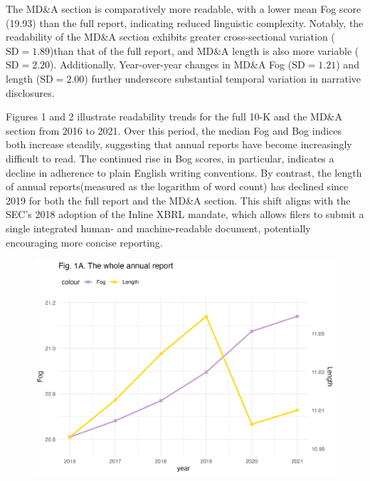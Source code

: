\documentclass[a4paper]{article}
\begin{document}
The MD\&A section is comparatively more readable, with a lower mean Fog score (19.93) than the full report, indicating reduced linguistic complexity. Notably, the readability of the MD\&A section exhibits greater cross-sectional variation ($\mathrm{SD} = 1.89$)than that of the full report, and MD\&A length is also more variable ($\mathrm{SD} = 2.20$). Additionally, Year-over-year changes in MD\&A Fog ($\mathrm{SD} = 1.21$)  and length ($\mathrm{SD} = 2.00$) further underscore substantial temporal variation in narrative disclosures.

Figures 1 and 2 illustrate readability trends for the full 10-K and the MD&A section from 2016 to 2021. Over this period, the median Fog and Bog indices both increase steadily, suggesting that annual reports have become increasingly difficult to read. The continued rise in Bog scores, in particular, indicates a decline in adherence to plain English writing conventions. By contrast, the length of annual reports(measured as the logarithm of word count) has declined since 2019 for both the full report and the MD&A section. This shift aligns with the SEC’s 2018 adoption of the Inline XBRL mandate, which allows filers to submit a single integrated human- and machine-readable document, potentially encouraging more concise reporting.

\begin{figure}[htbp] 
    \centering
    \includegraphics[width=\linewidth]{Images/fig1a.png}
\end{figure}
\end{document}

